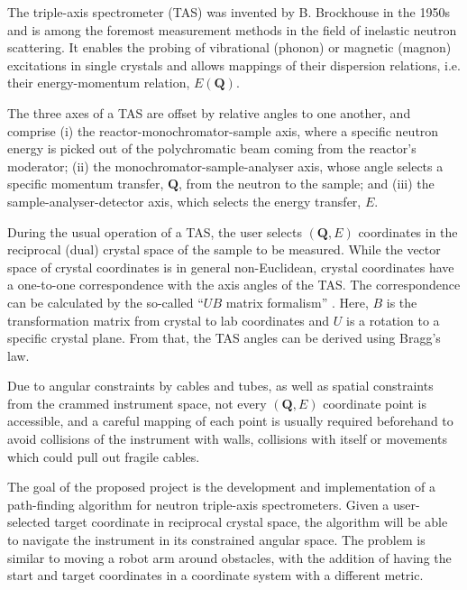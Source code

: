 %
%

The triple-axis spectrometer (TAS) \cite{Shirane2002} was invented by B. Brockhouse in the 1950s and 
is among the foremost measurement methods in the field of inelastic neutron scattering. 
It enables the probing of vibrational (phonon) or magnetic (magnon) excitations in single crystals and allows 
mappings of their dispersion relations, i.e. their energy-momentum relation, $E\left( \bm{Q} \right)$.

The three axes of a TAS are offset by relative angles to one another, and comprise 
(i) the reactor-monochromator-sample axis, where a specific neutron energy is picked out of the polychromatic 
beam coming from the reactor's moderator; 
(ii) the monochromator-sample-analyser axis, whose angle selects a specific momentum transfer, $\bm{Q}$, 
from the neutron to the sample; and 
(iii) the sample-analyser-detector axis, which selects the energy transfer, $E$.

During the usual operation of a TAS, the user selects $\left( \bm{Q}, E \right)$ coordinates in the reciprocal (dual)
crystal space of the sample to be measured. While the vector space of crystal coordinates 
is in general non-Euclidean, crystal coordinates have a one-to-one correspondence with the axis angles 
of the TAS. The correspondence can be calculated by the so-called ``$UB$ matrix formalism'' \cite{Lumsden2005}. 
Here, $B$ is the transformation matrix from crystal to lab coordinates and $U$ is a rotation to a specific 
crystal plane. From that, the TAS angles can be derived using Bragg's law.

Due to angular constraints by cables and tubes, as well as spatial constraints from the crammed instrument space, 
not every $\left( \bm{Q}, E \right)$ coordinate point is accessible, and a careful mapping of each point is
usually required beforehand to avoid collisions of the instrument with walls, collisions with itself or movements
which could pull out fragile cables.

The goal of the proposed project is the development and implementation of a path-finding algorithm for 
neutron triple-axis spectrometers. Given a user-selected target coordinate in reciprocal crystal space, 
the algorithm will be able to navigate the instrument in its constrained angular space. The problem is similar to 
moving a robot arm around obstacles, with the addition of having the start and target coordinates in a 
coordinate system with a different metric.

